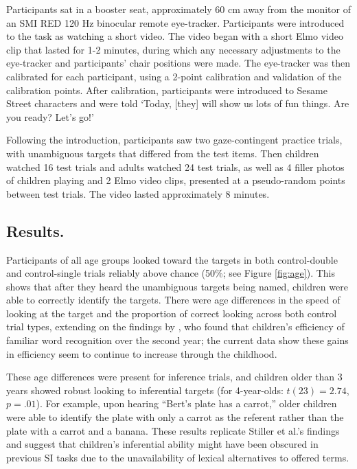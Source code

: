 \documentclass[10pt,letterpaper]{article}
\begin{document}
Participants sat in a booster seat, approximately 60 cm away from the monitor of an SMI RED 120 Hz binocular remote eye-tracker. Participants were introduced to the task as watching a short video. The video began with a short Elmo video clip that lasted for 1-2 minutes, during which any necessary adjustments to the eye-tracker and participants' chair positions were made. The eye-tracker was then calibrated for each participant, using a 2-point calibration and validation of the calibration points. After calibration, participants were introduced to Sesame Street characters and were told `Today, [they] will show us lots of fun things. Are you ready? Let's go!'

Following the introduction, participants saw two gaze-contingent practice trials, with unambiguous targets that differed from the test items. Then children watched 16 test trials and adults watched 24 test trials, as well as 4 filler photos of children playing and 2 Elmo video clips, presented at a pseudo-random points between test trials. The video lasted approximately 8 minutes.

\subsection{Results.}

Participants of all age groups looked toward the targets in both control-double and control-single trials reliably above chance (50\%; see Figure \ref{fig:age}). This shows that after they heard the unambiguous targets being named, children were able to correctly identify the targets. There were age differences in the speed of looking at the target and the proportion of correct looking across both control trial types, extending on the findings by , who found that children's efficiency of familiar word recognition over the second year; the current data show these gains in efficiency seem to continue to increase through the childhood. 

These age differences were present for inference trials, and children older than 3 years showed robust looking to inferential targets (for 4-year-olds: $t(23) = 2.74$, $p =.01$). For example, upon hearing ``Bert's plate has a carrot,'' older children were able to identify the plate with only a carrot as the referent rather than the plate with a carrot and a banana. These results replicate Stiller et al.'s findings and suggest that children's inferential ability might have been obscured in previous SI tasks due to the unavailability of lexical alternatives to offered terms.
\end{document}
